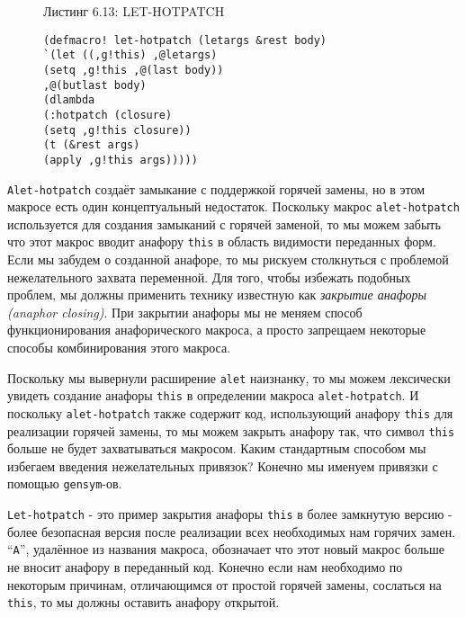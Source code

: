 \begin{figure}Листинг 6.13: LET-HOTPATCH\label{listing_6.13}
\listbegin
\begin{verbatim}
(defmacro! let-hotpatch (letargs &rest body)
`(let ((,g!this) ,@letargs)
(setq ,g!this ,@(last body))
,@(butlast body)
(dlambda
(:hotpatch (closure)
(setq ,g!this closure))
(t (&rest args)
(apply ,g!this args)))))
\end{verbatim}
\listend
\end{figure}

\verb"Alet-hotpatch" создаёт замыкание с поддержкой горячей замены, но в этом макросе есть один концептуальный недостаток. Поскольку макрос \verb"alet-hotpatch" используется для создания замыканий с горячей заменой, то мы можем забыть что этот макрос вводит анафору \verb"this" в область видимости переданных форм. Если мы забудем о созданной анафоре, то мы рискуем столкнуться с проблемой нежелательного захвата переменной. Для того, чтобы избежать подобных проблем, мы должны применить технику известную как \emph{закрытие анафоры (anaphor closing)}. При закрытии анафоры мы не меняем способ функционирования анафорического макроса, а просто запрещаем некоторые способы комбинирования этого макроса.

Поскольку мы вывернули расширение \verb"alet" наизнанку, то мы можем лексически увидеть создание анафоры \verb"this" в определении макроса \verb"alet-hotpatch". И поскольку \verb"alet-hotpatch" также содержит код, использующий анафору \verb"this" для реализации горячей замены, то мы можем закрыть анафору так, что символ \verb"this" больше не будет захватываться макросом. Каким стандартным способом мы избегаем введения нежелательных привязок? Конечно мы именуем привязки с помощью \verb"gensym"-ов.

\verb"Let-hotpatch" - это пример закрытия анафоры \verb"this" в более замкнутую версию - более безопасная версия после реализации всех необходимых нам горячих замен. ``\verb"A"'', удалённое из названия макроса, обозначает что этот новый макрос больше не вносит анафору в переданный код. Конечно если нам необходимо по некоторым причинам, отличающимся от простой горячей замены, сослаться на \verb"this", то мы должны оставить анафору открытой.

